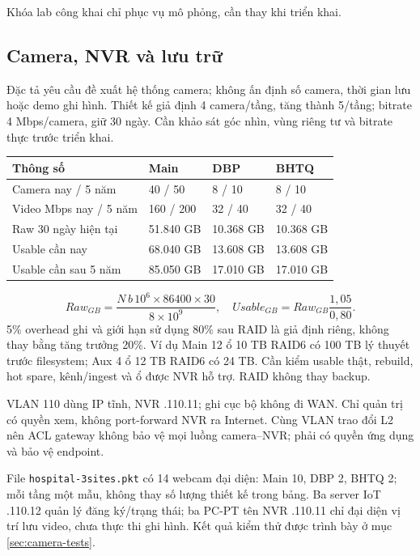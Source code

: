 \documentclass[
  11pt,
]{article}
\begin{document}
Khóa lab công khai chỉ phục vụ mô phỏng, cần thay khi triển khai.

\clearpage
\subsection{Camera, NVR và lưu trữ}
Đặc tả yêu cầu đề xuất hệ thống camera; không ấn định số camera, thời gian lưu hoặc demo ghi hình. Thiết kế giả định 4 camera/tầng, tăng thành 5/tầng; bitrate 4 Mbps/camera, giữ 30 ngày. Cần khảo sát góc nhìn, vùng riêng tư và bitrate thực trước triển khai.
\par\noindent
{}
\begin{tabularx}{\linewidth}{@{}lXXX@{}}\toprule
Thông số & Main & DBP & BHTQ\\\midrule
Camera nay / 5 năm & 40 / 50 & 8 / 10 & 8 / 10\\
Video Mbps nay / 5 năm & 160 / 200 & 32 / 40 & 32 / 40\\
Raw 30 ngày hiện tại & 51.840 GB & 10.368 GB & 10.368 GB\\
Usable cần nay & 68.040 GB & 13.608 GB & 13.608 GB\\
Usable cần sau 5 năm & 85.050 GB & 17.010 GB & 17.010 GB\\\bottomrule\end{tabularx}\par
\[Raw_{GB}=\frac{N\,b\,10^6\times86400\times30}{8\times10^9},\quad
Usable_{GB}=Raw_{GB}\frac{1,05}{0,80}.\]
5\% overhead ghi và giới hạn sử dụng 80\% sau RAID là giả định riêng, không thay bằng tăng trưởng 20\%. Ví dụ Main 12 ổ 10 TB RAID6 có 100 TB lý thuyết trước filesystem; Aux 4 ổ 12 TB RAID6 có 24 TB. Cần kiểm usable thật, rebuild, hot spare, kênh/ingest và ổ được NVR hỗ trợ. RAID không thay backup.

VLAN 110 dùng IP tĩnh, NVR .110.11; ghi cục bộ không đi WAN. Chỉ quản trị có quyền xem, không port-forward NVR ra Internet. Cùng VLAN trao đổi L2 nên ACL gateway không bảo vệ mọi luồng camera--NVR; phải có quyền ứng dụng và bảo vệ endpoint.

File \texttt{hospital-3sites.pkt} có 14 webcam đại diện: Main 10, DBP 2, BHTQ 2; mỗi tầng một mẫu, không thay số lượng thiết kế trong bảng. Ba server IoT .110.12 quản lý đăng ký/trạng thái; ba PC-PT tên NVR .110.11 chỉ đại diện vị trí lưu video, chưa thực thi ghi hình. Kết quả kiểm thử được trình bày ở mục \ref{sec:camera-tests}.

\clearpage
\end{document}
